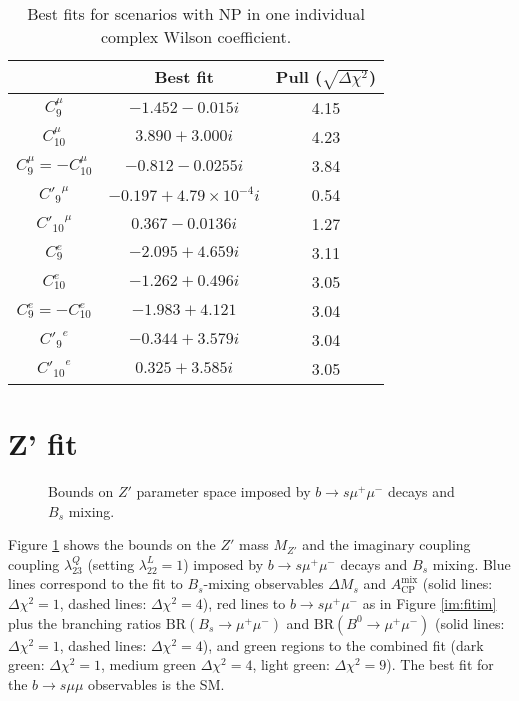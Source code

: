 \documentclass[11pt, a4paper]{article}
\begin{document}
\begin{table}[H]
\centering
\begin{tabular}{|c|c|c|}\hline
& Best fit & Pull ($\sqrt{\Delta\chi^2}$) \\\hline
$C_9^\mu$ & $-1.452-0.015i$ & 4.15 \\\hline
$C_{10}^\mu$ & $3.890 + 3.000i$ & 4.23 \\\hline
$C_9^\mu = -C_{10}^\mu$ & $-0.812 - 0.0255i$ & 3.84 \\\hline
${C'_9}^\mu$ & $-0.197 + 4.79\times 10^{-4} i$ & 0.54\\\hline
${C'_{10}}^\mu$ & $0.367-0.0136i$ & 1.27\\\hline 
$C_9^e$ & $-2.095+4.659i$ & 3.11 \\\hline
$C_{10}^e$ & $-1.262+0.496i$ & 3.05 \\\hline
$C_9^e = -C_{10}^e$ & $-1.983+4.121$ & 3.04\\\hline
${C'_9}^e$ & $-0.344+3.579i$ & 3.04\\\hline
${C'_{10}}^e$ & $0.325+3.585i$ & 3.05 \\\hline
\end{tabular}
\caption{Best fits for scenarios with NP in one individual complex Wilson coefficient.}
\end{table}
\section{Z' fit}
\begin{figure}[H]
\centering
\resizebox{0.6\textwidth}{!}{}
\caption{Bounds on $Z'$ parameter space imposed by $b\to s \mu^+ \mu^-$ decays and $B_s$ mixing.}\label{im:WCZ}
\end{figure}

Figure \ref{im:WCZ} shows the bounds on the $Z'$ mass $M_{Z'}$ and the imaginary coupling coupling $\lambda_{23}^Q$ (setting $\lambda_{22}^L=1$) imposed by $b\to s \mu^+ \mu^-$ decays and $B_s$ mixing. Blue lines correspond to the fit to $B_s$-mixing observables $\Delta M_s$ and $A_{\mathrm{CP}}^{\mathrm{mix}}$ (solid lines: $\Delta \chi^2 = 1$, dashed lines: $\Delta \chi^2 = 4$), red lines to $b\to s \mu^+ \mu^-$ as in Figure \ref{im:fitim} plus the branching ratios $\mathrm{BR}(B_s\to \mu^+ \mu^-)$ and $\mathrm{BR}(B^0 \to \mu^+ \mu^-)$ (solid lines: $\Delta \chi^2 = 1$, dashed lines: $\Delta \chi^2 = 4$), and green regions to the combined fit (dark green: $\Delta \chi^2 = 1$, medium green $\Delta \chi^2 = 4$, light green: $\Delta \chi^2 = 9$). The best fit for the $b\to s\mu\mu$ observables is the SM. 
\end{document}
